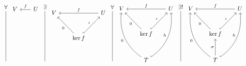 \documentclass[12pt]{amsart}
\theoremstyle{definition}
\DeclareMathOperator{\kernel}{\mathrm{ker}}
\begin{document}
\begin{enumerate}[start=0]
\[
    \begin{tikzcd}[row sep=1cm, column sep=.7cm]
     \forall\arrow[ddd, dash]\\
     \\
     \\
     \;
    \end{tikzcd} 
    \begin{tikzcd}[row sep=1cm, column sep=.65cm]
     V& U\arrow[l,"f"']\\
     &\\
     &\\
    \end{tikzcd}
    \begin{tikzcd}[row sep=1cm, column sep=.7cm]
     \exists\arrow[ddd, dash]\\
     \\
     \\
     \;
    \end{tikzcd} 
    \begin{tikzcd}[row sep=1cm, column sep=.65cm]
     V&& U\arrow[ll,"f"']\\
     &\kernel f\arrow[ur, hook, "\iota"]\arrow[ul, "0"]&\\
     & & 
    \end{tikzcd}
    \begin{tikzcd}[row sep=1cm, column sep=.7cm]
     \forall\arrow[ddd, dash,]\\
     \\
     \\
     \;
    \end{tikzcd}
    \begin{tikzcd}[row sep=1cm, column sep=.65cm]
     V&& U\arrow[ll,"f"']\\
     &\kernel f\arrow[ur, hook, "\iota"]\arrow[ul, "0"]&\\
     & T\arrow[uur, hook, "h", bend right]\arrow[uul, "0", bend left]& 
    \end{tikzcd}
    \begin{tikzcd}[row sep=1cm, column sep=.7cm]
     \exists!\arrow[ddd, dash]\\
     \\
     \\
     \;
    \end{tikzcd}
    \begin{tikzcd}[row sep=1cm, column sep=.65cm]
     V&& U\arrow[ll,"f"']\\
     &\kernel f\arrow[ur, hook, "\iota"]\arrow[ul, "0"]&\\
     & T\arrow[uur, hook, "h", bend right]\arrow[uul, "0", bend left]\arrow[u, "\sigma"]& 
    \end{tikzcd}
    \]


\end{enumerate}
\end{document}
